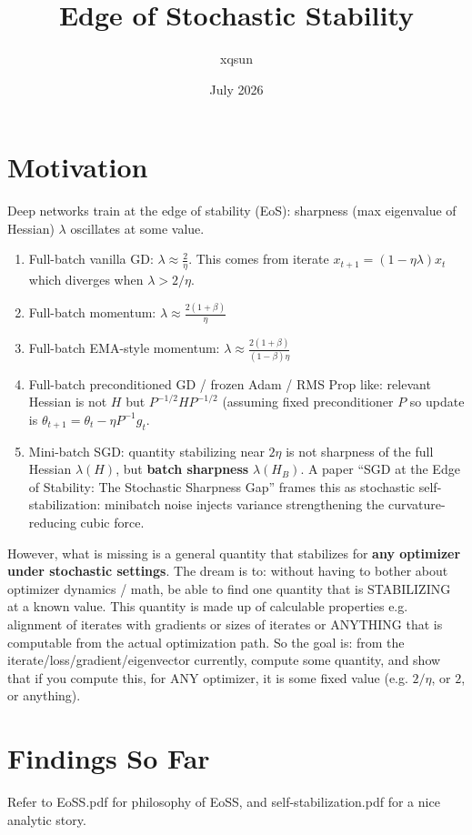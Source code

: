 \documentclass{article}
\title{Edge of Stochastic Stability}
\author{xqsun }
\date{July 2026}
\begin{document}
\maketitle

\section{Motivation}
Deep networks train at the edge of stability (EoS): sharpness (max eigenvalue of Hessian) $\lambda$ oscillates at some value.

\begin{enumerate}
    \item Full-batch vanilla GD: $\lambda \approx \frac{2}{\eta}$. This comes from iterate $x_{t+1}=(1-\eta \lambda) x_t$ which diverges when $\lambda > 2/\eta$.
    \item Full-batch momentum: $\lambda \approx \frac{2(1+\beta)}{\eta}$
    \item Full-batch EMA-style momentum: $\lambda \approx \frac{2(1+\beta)}{(1-\beta)\eta}$ 
    \item Full-batch preconditioned GD / frozen Adam / RMS Prop like: relevant Hessian is not $H$ but $P^{-1/2}HP^{-1/2}$ (assuming fixed preconditioner $P$ so update is $\theta_{t+1}=\theta_t-\eta P^{-1} g_t$.

    \item Mini-batch SGD: quantity stabilizing near $2\eta$ is not sharpness of the full Hessian $\lambda(H)$, but \textbf{batch sharpness} $\lambda(H_B)$. A paper ``SGD at the Edge of Stability: The Stochastic Sharpness Gap'' frames this as stochastic self-stabilization: minibatch noise injects variance strengthening the curvature-reducing cubic force.
\end{enumerate}

However, what is missing is a general quantity that stabilizes for \textbf{any optimizer under stochastic settings}. The dream is to: without having to bother about optimizer dynamics / math, be able to find one quantity that is STABILIZING at a known value. This quantity is made up of calculable properties e.g. alignment of iterates with gradients or sizes of iterates or ANYTHING that is computable from the actual optimization path. So the goal is: from the iterate/loss/gradient/eigenvector currently, compute some quantity, and show that if you compute this, for ANY optimizer, it is some fixed value (e.g. $2/\eta$, or $2$, or anything).

\section{Findings So Far}
Refer to EoSS.pdf for philosophy of EoSS, and self-stabilization.pdf for a nice analytic story.
\end{document}
